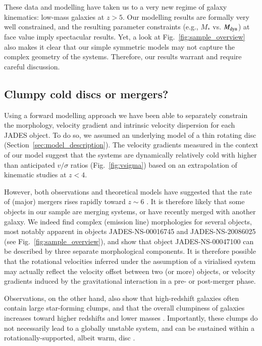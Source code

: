 \documentclass[longauth]{aa}
\newcommand{\Mdyn}{M_{\rm dyn}}
\begin{document}
These data and modelling have taken us to a very new regime of galaxy kinematics: low-mass galaxies at $z>5$. Our modelling results are formally very well constrained, and the resulting parameter constraints (e.g., $M_*$ vs. $\Mdyn$) at face value imply spectacular results. Yet, a look at Fig.~\ref{fig:sample_overview} also makes it clear that our simple symmetric models may not capture the complex geometry of the systems. Therefore, our results warrant and require careful discussion.


\subsection{Clumpy cold discs or mergers?} \label{sec:mergers}



Using a forward modelling approach we have been able to separately constrain the morphology, velocity gradient and intrinsic velocity dispersion for each JADES object. To do so, we assumed an underlying model of a thin rotating disc  (Section~\ref{sec:model_description}). The velocity gradients measured in the context of our model suggest that the systems are dynamically relatively cold with higher than anticipated $v/\sigma$ ratios (Fig.~\ref{fig:vsigma}) based on an extrapolation of kinematic studies at $z<4$.

However, both observations and theoretical models have suggested that the rate of (major) mergers rises rapidly toward $z\sim6$ \citep[e.g.,][]{Rodriguez2015,Bowler2017,Duncan2019,OLeary2021}. It is therefore likely that some objects in our sample are merging systems, or have recently merged with another galaxy. We indeed find complex (emission line) morphologies for several objects, most notably apparent in objects JADES-NS-00016745 and JADES-NS-20086025 (see Fig.~\ref{fig:sample_overview}), and \citet{Baker2023} show that object JADES-NS-00047100 can be described by three separate morphological components. It is therefore possible that the rotational velocities inferred under the assumption of a virialised system may actually reflect the velocity offset between two (or more) objects, or velocity gradients induced by the gravitational interaction in a pre- or post-merger phase. 

Observations, on the other hand, also show that high-redshift galaxies often contain large star-forming clumps, and that the overall clumpiness of galaxies increases toward higher redshifts and lower masses \citep[e.g.,][]{Guo2015,Carniani2018,Zhang2019,Sattari2023}. Importantly, these clumps do not necessarily lead to a globally unstable system, and can be sustained within a rotationally-supported, albeit warm, disc \citep{FSchreiber2011,Mandelker2014}.
\end{document}

